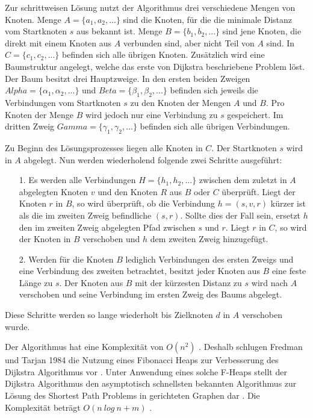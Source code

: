 Zur schrittweisen Lösung nutzt der Algorithmus drei verschiedene Mengen von Knoten. Menge $A = \{a_1, a_2, ...\}$ sind die Knoten, für die die minimale Distanz vom Startknoten $s$ aus bekannt ist. Menge $B = \{b_1, b_2, ...\}$ sind jene Knoten, die direkt mit einem Knoten aus $A$ verbunden sind, aber nicht Teil von $A$ sind. In $C = \{c_1, c_2, ...\}$ befinden sich alle übrigen Knoten.
Zusätzlich wird eine Baumstruktur angelegt, welche das erste von Dijkstra beschriebene Problem löst. Der Baum besitzt drei Hauptzweige. In den ersten beiden Zweigen $Alpha = \{\alpha_1, \alpha_2, ...\}$ und $Beta = \{\beta_1, \beta_2, ...\}$ befinden sich jeweils die Verbindungen vom Startknoten $s$ zu den Knoten der Mengen $A$ und $B$. Pro Knoten der Menge $B$ wird jedoch nur eine Verbindung zu $s$ gespeichert. Im dritten Zweig $Gamma = \{\gamma_1, \gamma_2, ...\}$ befinden sich alle übrigen Verbindungen. 

Zu Beginn des Lösungsprozesses liegen alle Knoten in $C$. Der Startknoten $s$ wird in $A$ abgelegt. Nun werden wiederholend folgende zwei Schritte ausgeführt:
\begin{itemize}
	\item[1.] Es werden alle Verbindungen $H = \{h_1, h_2, ...\}$ zwischen dem zuletzt in $A$ abgelegten Knoten $v$ und den Knoten $R$ aus $B$ oder $C$ überprüft. Liegt der Knoten $r$ in $B$, so wird überprüft, ob die Verbindung $h = \left(s, v, r\right)$ kürzer ist als die im zweiten Zweig befindliche $\left(s, r\right)$. Sollte dies der Fall sein, ersetzt $h$ den im zweiten Zweig abgelegten Pfad zwischen $s$ und $r$. Liegt $r$ in $C$, so wird der Knoten in $B$ verschoben und $h$ dem zweiten Zweig hinzugefügt.
	\item[2.] Werden für die Knoten $B$ lediglich Verbindungen des ersten Zweigs und eine Verbindung des zweiten betrachtet, besitzt jeder Knoten aus $B$ eine feste Länge zu $s$. Der Knoten aus $B$ mit der kürzesten Distanz zu $s$ wird nach $A$ verschoben und seine Verbindung im ersten Zweig des Baums abgelegt.
\end{itemize}
Diese Schritte werden so lange wiederholt bis Zielknoten $d$ in $A$ verschoben wurde.

Der Algorithmus hat eine Komplexität von $O(n^2)$ \cite{Madkour.2017}. Deshalb schlugen Fredman und Tarjan 1984 die Nutzung eines Fibonacci Heaps zur Verbesserung des Dijkstra Algorithmus vor \cite{Fredman.1987}. Unter Anwendung eines solche F-Heaps stellt der Dijkstra Algorithmus den asymptotisch schnellsten bekannten Algorithmus zur Lösung des Shortest Path Problems in gerichteten Graphen dar \cite{Schmitz.2019}.  Die Komplexität beträgt $O(n\ log\ n + m)$ \cite{Madkour.2017}. %



